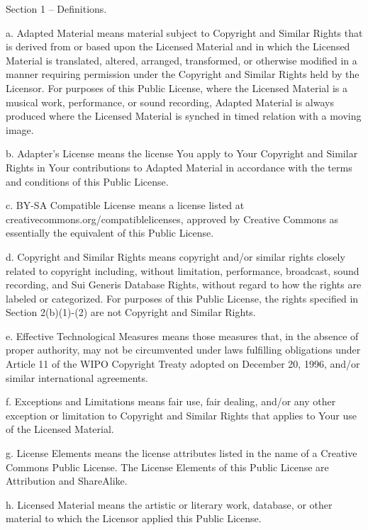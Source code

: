 Section 1 -- Definitions.

  a. Adapted Material means material subject to Copyright and Similar
     Rights that is derived from or based upon the Licensed Material
     and in which the Licensed Material is translated, altered,
     arranged, transformed, or otherwise modified in a manner requiring
     permission under the Copyright and Similar Rights held by the
     Licensor. For purposes of this Public License, where the Licensed
     Material is a musical work, performance, or sound recording,
     Adapted Material is always produced where the Licensed Material is
     synched in timed relation with a moving image.

  b. Adapter's License means the license You apply to Your Copyright
     and Similar Rights in Your contributions to Adapted Material in
     accordance with the terms and conditions of this Public License.

  c. BY-SA Compatible License means a license listed at
     creativecommons.org/compatiblelicenses, approved by Creative
     Commons as essentially the equivalent of this Public License.

  d. Copyright and Similar Rights means copyright and/or similar rights
     closely related to copyright including, without limitation,
     performance, broadcast, sound recording, and Sui Generis Database
     Rights, without regard to how the rights are labeled or
     categorized. For purposes of this Public License, the rights
     specified in Section 2(b)(1)-(2) are not Copyright and Similar
     Rights.

  e. Effective Technological Measures means those measures that, in the
     absence of proper authority, may not be circumvented under laws
     fulfilling obligations under Article 11 of the WIPO Copyright
     Treaty adopted on December 20, 1996, and/or similar international
     agreements.

  f. Exceptions and Limitations means fair use, fair dealing, and/or
     any other exception or limitation to Copyright and Similar Rights
     that applies to Your use of the Licensed Material.

  g. License Elements means the license attributes listed in the name
     of a Creative Commons Public License. The License Elements of this
     Public License are Attribution and ShareAlike.

  h. Licensed Material means the artistic or literary work, database,
     or other material to which the Licensor applied this Public
     License.

